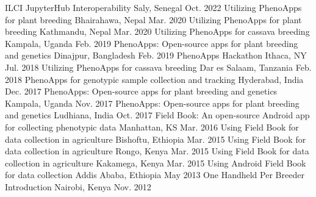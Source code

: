 \begin{cvworkshops}

  \cvworkshop
    {ILCI JupyterHub Interoperability} %
    {Saly, Senegal} %
    {Oct. 2022} %
  \cvworkshop
    {Utilizing PhenoApps for plant breeding} %
    {Bhairahawa, Nepal} %
    {Mar. 2020} %
  \cvworkshop
    {Utilizing PhenoApps for plant breeding} %
    {Kathmandu, Nepal} %
    {Mar. 2020} %
  \cvworkshop
    {Utilizing PhenoApps for cassava breeding} %
    {Kampala, Uganda} %
    {Feb. 2019} %
  \cvworkshop
    {PhenoApps: Open-source apps for plant breeding and genetics} %
    {Dinajpur, Bangladesh} %
    {Feb. 2019} %
  \cvworkshop
    {PhenoApps Hackathon} %
    {Ithaca, NY} %
    {Jul. 2018} %
  \cvworkshop
    {Utilizing PhenoApps for cassava breeding} %
    {Dar es Salaam, Tanzania} %
    {Feb. 2018} %
  \cvworkshop
    {PhenoApps for genotypic sample collection and tracking} %
    {Hyderabad, India} %
    {Dec. 2017} %
  \cvworkshop
    {PhenoApps: Open-source apps for plant breeding and genetics} %
    {Kampala, Uganda} %
    {Nov. 2017} %
  \cvworkshop
    {PhenoApps: Open-source apps for plant breeding and genetics} %
    {Ludhiana, India} %
    {Oct. 2017} %
  \cvworkshop
    {Field Book: An open-source Android app for collecting phenotypic data} %
    {Manhattan, KS} %
    {Mar. 2016} %
  \cvworkshop
    {Using Field Book for data collection in agriculture} %
    {Bishoftu, Ethiopia} %
    {Mar. 2015} %
  \cvworkshop
    {Using Field Book for data collection in agriculture} %
    {Rongo, Kenya} %
    {Mar. 2015} %
  \cvworkshop
    {Using Field Book for data collection in agriculture} %
    {Kakamega, Kenya} %
    {Mar. 2015} %
  \cvworkshop
    {Using Android Field Book for data collection} %
    {Addis Ababa, Ethiopia} %
    {May 2013} %
  \cvworkshop
    {One Handheld Per Breeder Introduction} %
    {Nairobi, Kenya} %
    {Nov. 2012} %
\end{cvworkshops}
